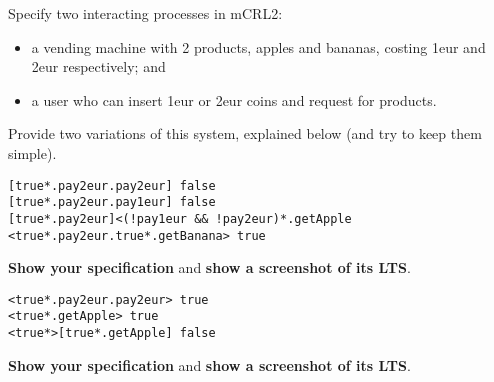 \documentclass[11pt]{article}
\begin{document}
\begin{myExercise}
Specify two interacting processes in mCRL2:
\begin{itemize}
  \item a vending machine with 2 products, apples and bananas, costing 1eur and 2eur respectively; and
  \item a user who can insert 1eur or 2eur coins and request for products.
\end{itemize}
Provide two variations of this system, explained below (and try to keep them simple).

\vspace{-6mm}
\begin{lstlisting}
[true*.pay2eur.pay2eur] false
[true*.pay2eur.pay1eur] false
[true*.pay2eur]<(!pay1eur && !pay2eur)*.getApple
<true*.pay2eur.true*.getBanana> true \end{lstlisting}
\textbf{Show your specification} and \textbf{show a screenshot of its LTS}.

\vspace{2mm}
\vspace{-6mm}
\begin{lstlisting}
<true*.pay2eur.pay2eur> true
<true*.getApple> true
<true*>[true*.getApple] false\end{lstlisting}
\textbf{Show your specification} and \textbf{show a screenshot of its LTS}.

\end{myExercise}


\end{document}
